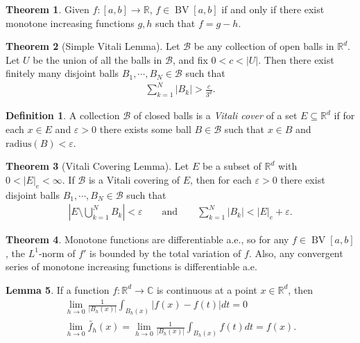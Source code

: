 \documentclass[a4paper,9pt]{extarticle}
\DeclareMathOperator*{\BV}{BV}
\theoremstyle{definition}
\newtheorem{defin}{Definition}
\newtheorem{thm}{Theorem}
\newtheorem{lem}[thm]{Lemma}
\begin{document}
\begin{thm}
    Given $f : [a, b] \to \mathbb{R}$, $f \in \BV[a, b]$ if and only if there exist monotone increasing functions $g, h$ such that $f = g - h$.
\end{thm}
\begin{thm}[Simple Vitali Lemma]
    Let $\mathcal{B}$ be any collection of open balls in $\mathbb{R}^d$. Let $U$ be the union of all the balls in $\mathcal{B}$, and fix $0 < c < |U|$. Then there exist finitely many disjoint balls $B_1, \cdots, B_N \in \mathcal{B}$ such that
    \begin{align*}
        \sum_{k = 1}^N |B_k| > \frac{c}{3^d}.
    \end{align*}
\end{thm}
\begin{defin}
    A collection $\mathcal{B}$ of closed balls is a \emph{Vitali cover} of a set $E \subseteq \mathbb{R}^d$ if for each $x \in E$ and $\varepsilon > 0$ there exists some ball $B \in \mathcal{B}$ such that $x \in B$ and $\text{radius}(B) < \varepsilon$.
\end{defin}
\begin{thm}[Vitali Covering Lemma]
    Let $E$ be a subset of $\mathbb{R}^d$ with $0 < |E|_e < \infty$. If $\mathcal{B}$ is a Vitali covering of $E$, then for each $\varepsilon > 0$ there exist disjoint balls $B_1, \cdots, B_N \in \mathcal{B}$ such that
    \begin{align*}
        \left| E \setminus \bigcup_{k = 1}^N B_k \right| < \varepsilon
        \qquad \text{and} \qquad
        \sum_{k = 1}^N |B_k| < |E|_e + \varepsilon.
    \end{align*}
\end{thm}
\begin{thm}
    Monotone functions are differentiable a.e., so for any $f \in \BV[a, b]$, the $L^1$-norm of $f'$ is bounded by the total variation of $f$. Also, any convergent series of monotone increasing functions is differentiable a.e.
\end{thm}
\begin{lem} \label{lem:pre-diff}
    If a function $f : \mathbb{R}^d \to \mathbb{C}$ is continuous at a point $x \in \mathbb{R}^d$, then
    \begin{gather*}
        \lim_{h \to 0} \frac{1}{|B_h(x)|} \int_{B_h(x)} |f(x) - f(t)| dt = 0 \\
        \lim_{h \to 0} \tilde{f_h}(x) = \lim_{h \to 0} \frac{1}{|B_h(x)|} \int_{B_h(x)} f(t) dt = f(x).
    \end{gather*}
\end{lem}
\end{document}
